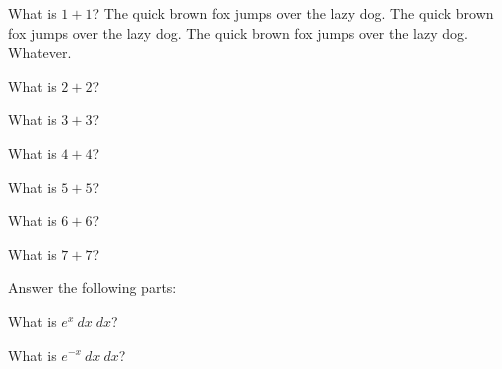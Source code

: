 \documentclass[12pt]{exam}%
\begin{document}
\begin{questions}
\question[5] What is \(1+1\)? The quick brown fox jumps over the lazy dog. The quick brown fox jumps over the lazy dog. The quick brown fox jumps over the lazy dog. Whatever. \answerline%

\question[5] What is \(2+2\)? \answerline%

\question[5] What is \(3+3\)? \answerline%


\question[5] What is \(4+4\)? \answerline%


\question[5] What is \(5+5\)? \answerline%


\question[5] What is \(6+6\)? \answerline%


\question[5] What is \(7+7\)? \answerline%


\question Answer the following parts:

\question[6] What is \(e^{x}\ dx\ dx\)? \answerline%

\question[6] What is \(e^{-x}\ dx\ dx\)? \answerline%


\end{questions}
\end{document}
